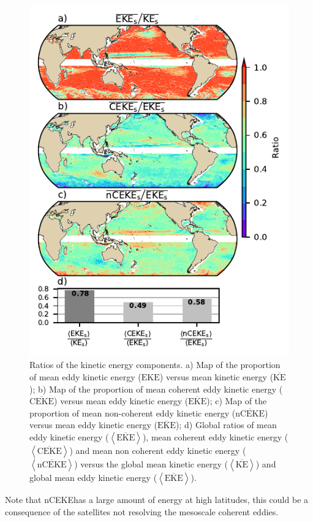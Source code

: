 \documentclass[draft,linenumbers]{agujournal2019}
\newcommand{\MKE}{\overline{\textrm{KE}}}
\newcommand{\MEKE}{\overline{\textrm{EKE}}}
\newcommand{\EKE}{\textrm{EKE}}
\newcommand{\MCEKE}{\overline{\textrm{CEKE}}}
\newcommand{\MnCEKE}{\overline{\textrm{nCEKE}}}
\newcommand{\nCEKE}{\textrm{nCEKE}}
\begin{document}
	\begin{figure}
	    \centering
	    \includegraphics[width=1\textwidth]{figures/eke_ratio_map_easy.pdf}
	    \caption{Ratios of the kinetic energy components. a) Map of the proportion of mean eddy kinetic energy ($\EKE$) versus mean kinetic energy ($\MKE$);
		b) Map of the proportion of mean coherent eddy kinetic energy ($\MCEKE$) versus mean eddy kinetic energy ($\MEKE$);
		c) Map of the proportion of mean non-coherent eddy kinetic energy ($\MnCEKE$) versus mean eddy kinetic energy ($\MEKE$);
		d) Global ratios of mean eddy kinetic energy ($\left<\MEKE\right>$), mean coherent eddy kinetic energy ($\left<\MCEKE\right>$) and mean non coherent eddy kinetic energy ($\left<\MnCEKE\right>$) versus the global mean kinetic energy ($\left<\MKE\right>$) and global mean eddy kinetic energy ($\left<\MEKE\right>$).
		}
	    \label{fig:eddy_ratio}
	\end{figure}

	Note that \nCEKE has a large amount of energy at high latitudes, this could be a consequence of the satellites not resolving the mesoscale coherent eddies. 
\end{document}
